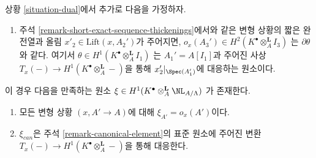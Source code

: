 \begin{lemma}
\label{lemma-dual-obstruction}
상황 \ref{situation-dual}에서 추가로 다음을 가정하자.
\begin{enumerate}
\item[(iv)] 주석 \ref{remark-short-exact-sequence-thickenings}에서와 같은
변형 상황의 짧은 완전열과 올림 $x'_2 \in \text{Lift}(x, A_2')$가 주어지면,
$o_x(A_3') \in H^2(K^\bullet \otimes_A^\mathbf{L} I_3)$
는 $\partial\theta$와 같다. 여기서
$\theta \in H^1(K^\bullet \otimes_A^\mathbf{L} I_1)$
는 $A_1' = A[I_1]$과 주어진 사상
$T_x(-) \to H^1(K^\bullet \otimes_A^\mathbf{L} -)$을 통해
$x'_2|_{\Spec(A_1')}$에 대응하는 원소이다.
\end{enumerate}
이 경우 다음을 만족하는 원소
$\xi \in H^1(K^\bullet \otimes_A^\mathbf{L} \NL_{A/\Lambda})$
가 존재한다.
\begin{enumerate}
\item 모든 변형 상황 $(x, A' \to A)$에 대해
$\xi_{A'} = o_x(A')$이다.
\item $\xi_{can}$은 주석 \ref{remark-canonical-element}의 표준 원소에
주어진 변환 $T_x(-) \to H^1(K^\bullet \otimes_A^\mathbf{L} -)$을 통해 대응한다.
\end{enumerate}
\end{lemma}


